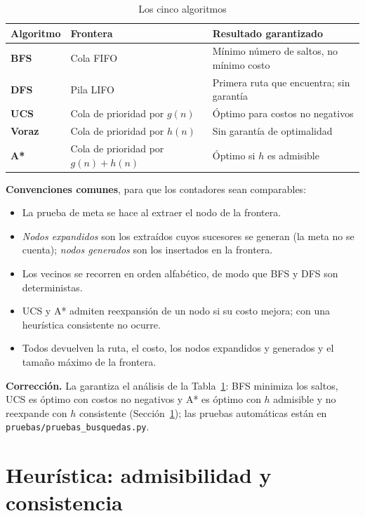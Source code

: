 \documentclass[12pt,a4paper]{article}
\begin{document}
\begin{table}[H]
\centering
\caption{Los cinco algoritmos}
\label{tab:algoritmos}
\small
\renewcommand{\arraystretch}{1.2}
\begin{tabular}{|>{\raggedright\arraybackslash}p{2.2cm}|>{\raggedright\arraybackslash}p{4.2cm}|>{\raggedright\arraybackslash}p{6.3cm}|}
\hline
\rowcolor{gray!20} \textbf{Algoritmo} & \textbf{Frontera} & \textbf{Resultado garantizado} \\
\hline
\textbf{BFS} & Cola FIFO & Mínimo número de saltos, no mínimo costo \\
\hline
\textbf{DFS} & Pila LIFO & Primera ruta que encuentra; sin garantía \\
\hline
\textbf{UCS} & Cola de prioridad por $g(n)$ & Óptimo para costos no negativos \\
\hline
\textbf{Voraz} & Cola de prioridad por $h(n)$ & Sin garantía de optimalidad \\
\hline
\textbf{A*} & Cola de prioridad por $g(n)+h(n)$ & Óptimo si $h$ es admisible \\
\hline
\end{tabular}
\end{table}

\textbf{Convenciones comunes}, para que los contadores sean comparables:
\begin{itemize}
\item La prueba de meta se hace al extraer el nodo de la frontera.
\item \emph{Nodos expandidos} son los extraídos cuyos sucesores se generan (la
meta no se cuenta); \emph{nodos generados} son los insertados en la frontera.
\item Los vecinos se recorren en orden alfabético, de modo que BFS y DFS son
deterministas.
\item UCS y A* admiten reexpansión de un nodo si su costo mejora; con una
heurística consistente no ocurre.
\item Todos devuelven la ruta, el costo, los nodos expandidos y generados y el
tamaño máximo de la frontera.
\end{itemize}

\textbf{Corrección.} La garantiza el análisis de la Tabla~\ref{tab:algoritmos}:
BFS minimiza los saltos, UCS es óptimo con costos no negativos y A* es óptimo con
$h$ admisible y no reexpande con $h$ consistente
(Sección~\ref{sec:heuristica}); las pruebas automáticas están en
\texttt{pruebas/\allowbreak pruebas\_busquedas.py}.

\section{Heurística: admisibilidad y consistencia}
\label{sec:heuristica}
\end{document}
